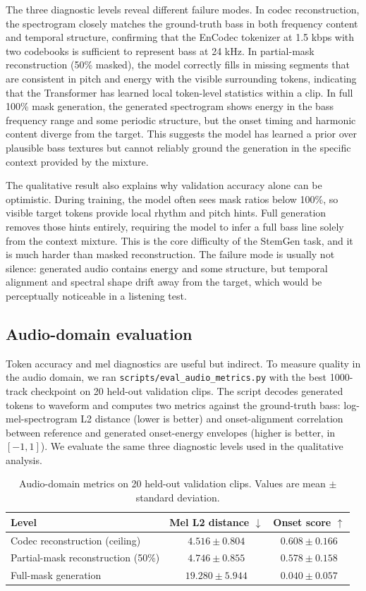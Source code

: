 \documentclass{article}
\begin{document}
The three diagnostic levels reveal different failure modes. In codec reconstruction, the spectrogram closely matches the ground-truth bass in both frequency content and temporal structure, confirming that the EnCodec tokenizer at 1.5 kbps with two codebooks is sufficient to represent bass at 24 kHz. In partial-mask reconstruction (50\% masked), the model correctly fills in missing segments that are consistent in pitch and energy with the visible surrounding tokens, indicating that the Transformer has learned local token-level statistics within a clip. In full 100\% mask generation, the generated spectrogram shows energy in the bass frequency range and some periodic structure, but the onset timing and harmonic content diverge from the target. This suggests the model has learned a prior over plausible bass textures but cannot reliably ground the generation in the specific context provided by the mixture.

The qualitative result also explains why validation accuracy alone can be optimistic. During training, the model often sees mask ratios below 100\%, so visible target tokens provide local rhythm and pitch hints. Full generation removes those hints entirely, requiring the model to infer a full bass line solely from the context mixture. This is the core difficulty of the StemGen task, and it is much harder than masked reconstruction. The failure mode is usually not silence: generated audio contains energy and some structure, but temporal alignment and spectral shape drift away from the target, which would be perceptually noticeable in a listening test.

\subsection{Audio-domain evaluation}

Token accuracy and mel diagnostics are useful but indirect. To measure quality in the audio domain, we ran \texttt{scripts/eval\_audio\_metrics.py} with the best 1000-track checkpoint on 20 held-out validation clips. The script decodes generated tokens to waveform and computes two metrics against the ground-truth bass: log-mel-spectrogram L2 distance (lower is better) and onset-alignment correlation between reference and generated onset-energy envelopes (higher is better, in $[-1,1]$). We evaluate the same three diagnostic levels used in the qualitative analysis.

\begin{table}[H]
\centering
\caption{Audio-domain metrics on 20 held-out validation clips. Values are mean $\pm$ standard deviation.}
\label{tab:audio_metrics}
\begin{tabular}{lcc}
\toprule
Level & Mel L2 distance $\downarrow$ & Onset score $\uparrow$ \\
\midrule
Codec reconstruction (ceiling) & $4.516 \pm 0.804$ & $0.608 \pm 0.166$ \\
Partial-mask reconstruction (50\%) & $4.746 \pm 0.855$ & $0.578 \pm 0.158$ \\
Full-mask generation & $19.280 \pm 5.944$ & $0.040 \pm 0.057$ \\
\bottomrule
\end{tabular}
\end{table}
\end{document}
